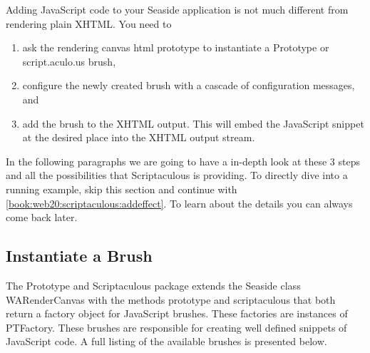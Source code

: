 \documentclass[a4paper,10pt,twoside]{book}
\newcommand{\ct}[1]{{\small\ttfamily\textup{#1}}}
\begin{document}
Adding JavaScript code to your Seaside application is not much different from rendering plain XHTML. You need to

\begin{enumerate}
\item  ask the rendering canvas \ct{html prototype} to instantiate a Prototype or script.aculo.us brush,
\item  configure the newly created brush with a cascade of configuration messages, and
\item  add the brush to the XHTML output. This will embed the JavaScript snippet at the desired place into the XHTML output stream.
\end{enumerate}

In the following paragraphs we are going to have a in-depth look at these 3 steps and all the possibilities that Scriptaculous is providing. To directly dive into a running example, skip this section and continue with \autoref{book:web20:scriptaculous:addeffect}. To learn about the details you can always come back later.

\subsection{Instantiate a Brush}
\label{book:web20:scriptaculous:snippetsandbrushes:instantiatebrush}

The Prototype and Scriptaculous package extends the Seaside class  \ct{WARenderCanvas} with the methods \ct{prototype} and \ct{scriptaculous} that both return a factory object for JavaScript brushes. These factories are instances of \ct{PTFactory}. These brushes are responsible for creating well defined snippets of JavaScript code. A full listing of the available brushes is presented below.
\end{document}
